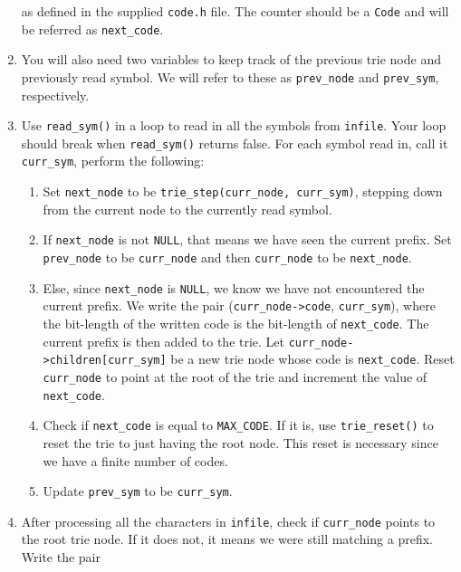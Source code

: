\begin{enumerate}
      as defined in the supplied \texttt{code.h} file. The counter
      should be a \texttt{Code} and will be referred as \texttt{next\_code}.
    \item You will also need two variables to keep track of the previous
      trie node and previously read symbol. We will refer to these as
      \texttt{prev\_node} and \texttt{prev\_sym}, respectively.
    \item Use \texttt{read\_sym()} in a loop to read in all the symbols
      from \texttt{infile}. Your loop should break when
      \texttt{read\_sym()} returns false. For each symbol read in, call
      it \texttt{curr\_sym}, perform the following:
      \begin{enumerate}
          \item Set \texttt{next\_node} to be \texttt{trie\_step(curr\_node,
              curr\_sym)}, stepping down from the current node to the
              currently read symbol.
          \item If \texttt{next\_node} is not \texttt{NULL}, that means we
              have seen the current prefix. Set \texttt{prev\_node} to be
              \texttt{curr\_node} and then \texttt{curr\_node} to be
              \texttt{next\_node}.
          \item Else, since \texttt{next\_node} is \texttt{NULL}, we know we
              have not encountered the current prefix. We write the pair
              (\texttt{curr\_node->code}, \texttt{curr\_sym}), where the
              bit-length of the written code is the bit-length of
              \texttt{next\_code}. The current prefix is then added to the trie.
              Let \texttt{curr\_node->children[curr\_sym]} be a new trie node
              whose code is \texttt{next\_code}. Reset \texttt{curr\_node} to
              point at the root of the trie and increment the value of
              \texttt{next\_code}.
          \item Check if \texttt{next\_code} is equal to \texttt{MAX\_CODE}.
              If it is, use \texttt{trie\_reset()} to reset the trie to just
              having the root node. This reset is necessary since we have a
              finite number of codes.
          \item Update \texttt{prev\_sym} to be \texttt{curr\_sym}.
      \end{enumerate}
    \item After processing all the characters in \texttt{infile}, check
      if \texttt{curr\_node} points to the root trie node. If it does
      not, it means we were still matching a prefix. Write the pair

\end{enumerate}
